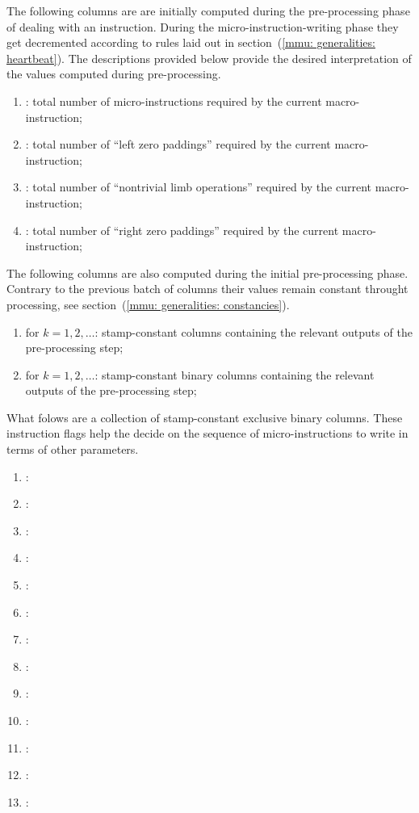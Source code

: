 The following columns are are initially computed during the pre-processing phase of dealing with an \mmuMod{} instruction.
During the micro-instruction-writing phase they get decremented according to rules laid out in section~(\ref{mmu: generalities: heartbeat}).
The descriptions provided below provide the desired interpretation of the values computed during pre-processing. 
\begin{enumerate}[resume]
	\item \ppTot:
		total number of micro-instructions required by the current macro-instruction;	
	\item \ppTotLZ:
		total number of ``left zero paddings'' required by the current macro-instruction;	
	\item \ppTotNT:
		total number of ``nontrivial limb operations'' required by the current macro-instruction;
	\item \ppTotRZ:
		total number of ``right zero paddings'' required by the current macro-instruction;	
\end{enumerate}
The following columns are also computed during the initial pre-processing phase.
Contrary to the previous batch of columns their values remain constant throught processing, see section~(\ref{mmu: generalities: constancies}).
\begin{enumerate}[resume]
	\item {} for $k=1, 2, \dots$:
		stamp-constant columns containing the relevant outputs of the pre-processing step;
	\item {} for $k=1, 2, \dots$:
		stamp-constant binary columns containing the relevant outputs of the pre-processing step;
\end{enumerate}
What folows are a collection of stamp-constant exclusive binary columns.
These instruction flags help the \mmuMod{} decide on the sequence of micro-instructions to write in terms of other parameters. 
\begin{enumerate}[resume]
	\item \mmuInstFlagMload{}:
	\item \mmuInstFlagMstore{}:
	\item \mmuInstFlagMstoreEight{}:
	\item \mmuInstFlagInvalidCodePrefix{}:
	\item \mmuInstFlagRightPaddedWordExtraction{}:
	\item \mmuInstFlagRamToExoWithPadding{}:
	\item \mmuInstFlagExoToRamTransplants{}:
	\item \mmuInstFlagRamToRamSansPadding{}:
	\item \mmuInstFlagAnyToRamWithPaddingSomeData{}:
	\item \mmuInstFlagAnyToRamWithPaddingPurePadding{}:
	\item \mmuInstFlagModexpZero{}:
	\item \mmuInstFlagModexpData{}:
	\item \mmuInstFlagBlake{}:
\end{enumerate}
